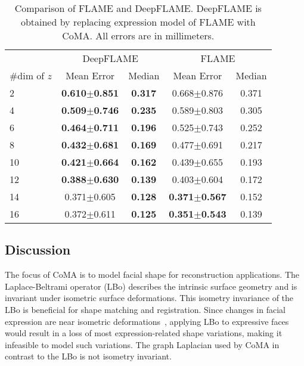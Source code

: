 \begin{table}[t]
\begin{center}
\caption{Comparison of FLAME and DeepFLAME. DeepFLAME is obtained by replacing expression model of FLAME with CoMA. All errors are in millimeters.}
\begin{tabular}{l|cc|cc}
&  \multicolumn{2}{|c}{DeepFLAME} & \multicolumn{2}{|c}{FLAME \cite{FLAME2017}}  \\
\#dim of $z$   &  Mean Error & Median & Mean Error & Median  \\ \hline
2 & \textbf{0.610$\pm$0.851} & \textbf{0.317} & 0.668$\pm$0.876 & 0.371 \\
4 &  \textbf{0.509$\pm$0.746} & \textbf{0.235} &0.589$\pm$0.803 & 0.305 \\
6 &  \textbf{0.464$\pm$0.711} & \textbf{0.196} &0.525$\pm$0.743 & 0.252 \\
8 &  \textbf{0.432$\pm$0.681} & \textbf{0.169} &0.477$\pm$0.691 & 0.217 \\
10 &  \textbf{0.421$\pm$0.664} & \textbf{0.162} &0.439$\pm$0.655 & 0.193 \\
12 &  \textbf{0.388$\pm$0.630} & \textbf{0.139} &0.403$\pm$0.604 & 0.172 \\
14 &  0.371$\pm$0.605 & \textbf{0.128} &\textbf{0.371$\pm$0.567} & 0.152 \\
16 &  0.372$\pm$0.611 & \textbf{0.125} &\textbf{0.351$\pm$0.543} & 0.139
\end{tabular}
\label{tab:ablexp}
\end{center}
\end{table}















\subsection{Discussion}

The focus of CoMA is to model facial shape for reconstruction applications. The Laplace-Beltrami operator (LBo) describes the intrinsic surface geometry and is invariant under isometric surface deformations. This isometry invariance of the LBo is beneficial for shape matching and registration. Since changes in facial expression are near isometric deformations~\cite[Section 13.3]{Bronstein2008}, applying LBo to expressive faces would result in a loss of most expression-related shape variations, making it infeasible to model such variations. The graph Laplacian used by CoMA in contrast to the LBo is not isometry invariant.


